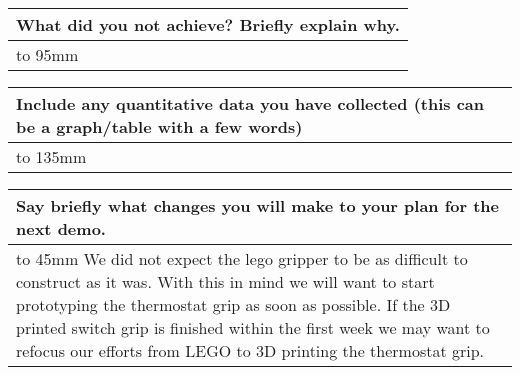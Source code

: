 \documentclass[a4paper]{article}
\newcommand{\colWidth}{141mm}
\begin{document}
\begin{center}

\begin{tabular}{|p{\colWidth}|}
	\hline
	\cellcolor{blue!25}\large
	\textbf{What did you not achieve? Briefly explain why.}
	\\ \hline
	\vtop to 95mm{

  }
  \\
  \hline
\end{tabular}
\vskip 5mm


\begin{tabular}{|p{\colWidth}|}
	\hline
	\cellcolor{blue!25}\large
	\textbf{Include any quantitative data you have collected (this can be a graph/table with a few words)}
	\\ \hline
	\vtop to 135mm{

  }
  \\
  \hline
\end{tabular}
\vskip 5mm


\begin{tabular}{|p{\colWidth}|}
	\hline
	\cellcolor{blue!25}\large
	\textbf{Say briefly what changes you will make to your plan for the next demo.}
	\\ \hline
	\vtop to 45mm{
		We did not expect the lego gripper to be as difficult to construct as it was. With this in mind we will want to start prototyping the thermostat grip as soon as possible. If the 3D printed switch grip is finished within the first week we may want to refocus our efforts from LEGO to 3D printing the thermostat grip.
  }
  \\
  \hline
\end{tabular}

\end{center}
  
\end{document}
